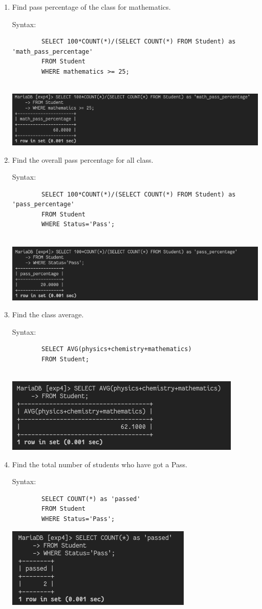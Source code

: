 \documentclass[13pt,oneside]{book}
\begin{document}
\begin{enumerate}
		
		\item
		Find pass percentage of the class for mathematics. 
		 
		Syntax:
		\begin{verbatim}
		SELECT 100*COUNT(*)/(SELECT COUNT(*) FROM Student) as 'math_pass_percentage'
		FROM Student
		WHERE mathematics >= 25;
		
		\end{verbatim}
		\includegraphics[]{img/p4/ss8.png}
		
		
		\item
		Find the overall pass percentage for all class. 
		 
		Syntax:
		\begin{verbatim}
		SELECT 100*COUNT(*)/(SELECT COUNT(*) FROM Student) as 'pass_percentage'
		FROM Student
		WHERE Status='Pass';
		
		\end{verbatim}
		\includegraphics[]{img/p4/ss9.png}
		
		
		\item
		Find the class average. 
		 
		Syntax:
		\begin{verbatim}
		SELECT AVG(physics+chemistry+mathematics)
		FROM Student;
		
		\end{verbatim}
		\includegraphics[]{img/p4/ss10.png}
		
		
		\item
		Find the total number of students who have got a Pass.
		
		Syntax:
		\begin{verbatim}
		SELECT COUNT(*) as 'passed'
		FROM Student
		WHERE Status='Pass';
		\end{verbatim}
		\includegraphics[]{img/p4/ss11.png}
	\end{enumerate}		
\end{document}
